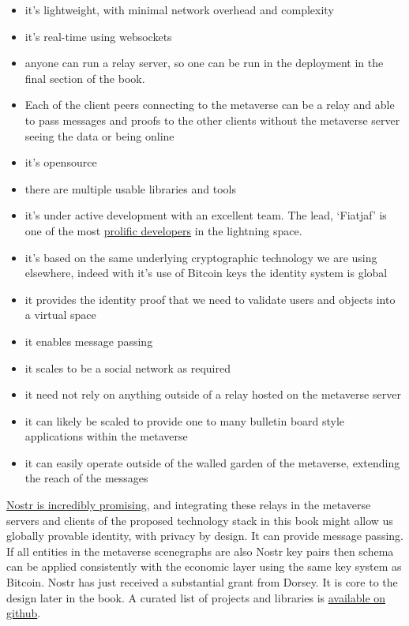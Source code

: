 \begin{itemize}
\item it's lightweight, with minimal network overhead and complexity
\item it's real-time using websockets
\item anyone can run a relay server, so one can be run in the deployment in the final section of the book.
\item Each of the client peers connecting to the metaverse can be a relay and able to pass messages and proofs to the other clients without the metaverse server seeing the data or being online 
\item it's opensource
\item there are multiple usable libraries and tools
\item it's under active development with an excellent team. The lead, `Fiatjaf' is one of the most \href{https://github.com/fiatjaf}{prolific developers} in the lightning space.
\item it's based on the same underlying cryptographic technology we are using elsewhere, indeed with it's use of Bitcoin keys the identity system is global
\item it provides the identity proof that we need to validate users and objects into a virtual space
\item it enables message passing
\item it scales to be a social network as required
\item it need not rely on anything outside of a relay hosted on the metaverse server
\item it can likely be scaled to provide one to many bulletin board style applications within the metaverse
\item it can easily operate outside of the walled garden of the metaverse, extending the reach of the messages
\end{itemize} 
\href{https://www.forbes.com/sites/rogerhuang/2022/12/29/nostr-is-the-decentralized-protocol-that-might-replace-elon-musks-twitter/?sh=79e2b2be442a}{Nostr is incredibly promising}, and integrating these relays in the metaverse servers and clients of the proposed technology stack in this book might allow us globally provable identity, with privacy by design. It can provide message passing. If all entities in the metaverse scenegraphs are also Nostr key pairs then schema can be applied consistently with the economic layer using the same key system as Bitcoin. Nostr has just received a substantial grant from Dorsey. It is core to the design later in the book. A curated list of projects and libraries is \href{https://github.com/aljazceru/awesome-nostr}{available on github}.\par
